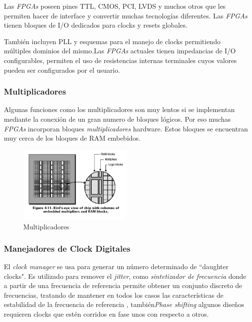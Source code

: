 Las \textit{FPGAs} poseen pines TTL, CMOS, PCI, LVDS y muchos otros que les permiten hacer de interface y convertir muchas tecnologías diferentes. Las \textit{FPGAs} tienen bloques de I/O dedicados para clocks y resets globales.  

También incluyen PLL y esquemas para el manejo de clocks permitiendo múltiples dominios del mismo.Las \textit{FPGAs} actuales tienen impedancias de I/O configurables,  permiten el uso de resistencias internas terminales cuyos valores pueden ser configurados por el usuario.

	\subsubsection{Multiplicadores}

Algunas funciones como los multiplicadores son muy lentos si se implementan mediante la conexión de un gran numero de bloques lógicos. Por eso muchas \textit{FPGAs} incorporan bloques \textit{multiplicadores} hardware. Estos bloques se encuentran muy cerca de los bloques de RAM embebidos. 

\begin{figure}[h!]
 \begin{center}
 \includegraphics[width=0.5\textwidth,keepaspectratio=true]{./images/multram}
  \caption{Multiplicadores}
  \label{fig:esquema}
 \end{center}
\end{figure}

	\subsubsection{Manejadores de Clock Digitales}

El \textit{clock manager} se usa para generar un número determinado de “daughter clocks". Es utilizado para remover el \textit{jitter}, como \textit{sintetizador de frecuencia} donde a partir de una frecuencia de referencia permite obtener un conjunto discreto de frecuencias, tratando de mantener en todos los casos las características de estabilidad de la frecuencia de referencia \cite{Etiqueta03}, también\textit{Phase shifting} algunos diseños requieren clocks que estén corridos en fase unos con respecto a otros.

